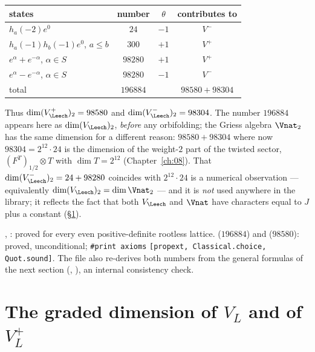 \begin{example}\label{ch04:ex:wt2}
\begin{center}
\begin{tabular}{lccc}
\toprule
states & number & $\theta$ & contributes to \\
\midrule
$h_a(-2)e^0$ & $24$ & $-1$ & $V^-$\\
$h_a(-1)h_b(-1)e^0$, $a\le b$ & $300$ & $+1$ & $V^+$\\
$e^\alpha+e^{-\alpha}$, $\alpha\in S$ & $98280$ & $+1$ & $V^+$\\
$e^\alpha-e^{-\alpha}$, $\alpha\in S$ & $98280$ & $-1$ & $V^-$\\
\midrule
total & $196884$ & & $98580+98304$\\
\bottomrule
\end{tabular}
\end{center}
Thus $\dim(V_\Leech^+)_2=98580$ and $\dim(V_\Leech^-)_2=98304$. The number $196884$ appears here as
$\dim(V_\Leech)_2$, \emph{before} any orbifolding; the Griess algebra $\Vnat_2$ has the same
dimension for a different reason: $98580+98304$ where now $98304=2^{12}\cdot24$ is the dimension of
the weight-$2$ part of the twisted sector, $(F^{T})_{1/2}\otimes T$ with $\dim T=2^{12}$ (Chapter~\ref{ch:08}).
That $\dim(V_\Leech^-)_2=24+98280$ coincides with $2^{12}\cdot24$ is a numerical observation
--- equivalently $\dim(V_\Leech)_2=\dim\Vnat_2$ --- and it is \emph{not} used anywhere in the
library; it reflects the fact that both $V_\Leech$ and $\Vnat$ have characters equal to $J$ plus a
constant (\S\ref{ch04:sec:gradeddim}).
\end{example}

\begin{status}
, : proved for every even positive-definite
rootless lattice.  ($196884$) and
 ($98580$): proved, unconditional; \texttt{\#print axioms}
\texttt{[propext, Classical.choice, Quot.sound]}. The file  also
re-derives both numbers from the general formulas of the next section
(, ), an
internal consistency check.
\end{status}

\section{The graded dimension of \texorpdfstring{$V_L$}{VL} and of \texorpdfstring{$V_L^+$}{VL+}}\label{ch04:sec:gradeddim}

